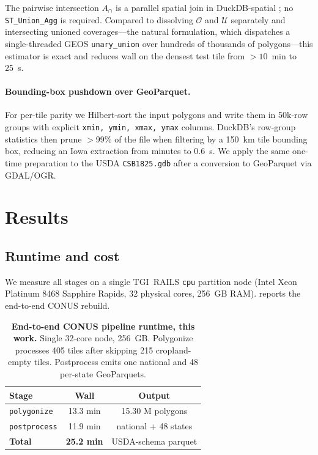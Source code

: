 \documentclass{article}
\begin{document}
The pairwise intersection $A_\cap$ is a parallel spatial join in
DuckDB-spatial \citep{duckdbspatial}; no \texttt{ST\_Union\_Agg} is
required. Compared to dissolving $\mathcal{O}$ and $\mathcal{U}$
separately and intersecting unioned coverages---the natural
formulation, which dispatches a single-threaded GEOS
\texttt{unary\_union} over hundreds of thousands of polygons---this
estimator is exact and reduces wall on the densest test tile from
$>10$~min to 25~s.

\paragraph{Bounding-box pushdown over GeoParquet.}
For per-tile parity we Hilbert-sort the input polygons and write them
in 50k-row groups with explicit \texttt{xmin, ymin, xmax, ymax}
columns. DuckDB's row-group statistics then prune $>$99\% of the file when
filtering by a 150~km tile bounding box, reducing an Iowa extraction
from minutes to 0.6~s. We apply the same one-time
preparation to the USDA \texttt{CSB1825.gdb} after a conversion to
GeoParquet via GDAL/OGR.

\section{Results}
\label{sec:results}

\subsection{Runtime and cost}
\label{sec:results-runtime}

We measure all stages on a single TGI~RAILS \texttt{cpu} partition
node (Intel Xeon Platinum 8468 Sapphire Rapids, 32 physical cores,
256~GB RAM).  reports the end-to-end CONUS rebuild.

\begin{table}[t]
\centering
\caption{\textbf{End-to-end CONUS pipeline runtime, this work.}
Single 32-core node, 256~GB. Polygonize processes 405 tiles after
skipping 215 cropland-empty tiles. Postprocess emits one national and
48 per-state GeoParquets.}
\label{tab:runtime}
\small
\begin{tabular}{lcc}
\toprule
Stage & Wall & Output \\
\midrule
\texttt{polygonize}  & 13.3 min & 15.30 M polygons \\
\texttt{postprocess} & 11.9 min & national + 48 states \\
\midrule
\textbf{Total}       & \textbf{25.2 min} & USDA-schema parquet \\
\bottomrule
\end{tabular}
\end{table}
\end{document}
